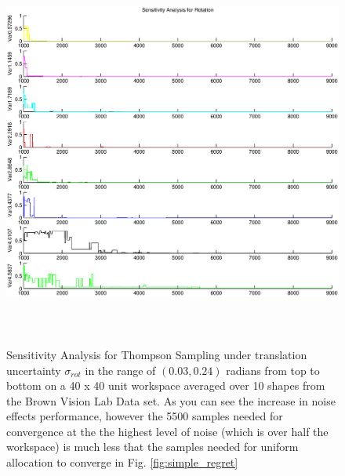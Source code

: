 \documentclass[journal,transmag]{IEEEtran}%
\begin{document}
\begin{figure}[ht!]
\centering
\includegraphics[width = 16.5cm, height = 13cm]{matlab_figures/sensitivity_rot.eps}
\caption{ \footnotesize Sensitivity Analysis for Thompson Sampling under translation uncertainty $\sigma_{rot}$ in the range of $(0.03, 0.24)$ radians from top to bottom on a 40 x 40 unit workspace averaged over 10 shapes from the Brown Vision Lab Data set.  As you can see the increase in noise effects performance, however the 5500 samples needed for convergence at the the highest level of noise (which is over half the workspace) is much less that the samples needed for uniform allocation to converge in Fig. \ref{fig:simple_regret}}
\vspace*{-10pt}
\label{fig:rot_sens}
\end{figure}
\end{document}

